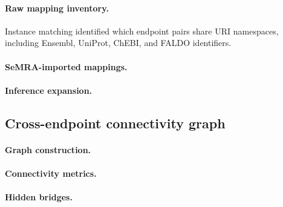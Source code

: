 \documentclass[12pt]{article}
\begin{document}
\paragraph*{Raw mapping inventory.}
Instance matching identified which endpoint pairs share URI
namespaces, including Ensembl, UniProt, ChEBI, and FALDO identifiers.

\paragraph*{SeMRA-imported mappings.}

\paragraph*{Inference expansion.}

\subsection{Cross-endpoint connectivity graph}
\label{sec:results-connectivity}

\paragraph*{Graph construction.}

\paragraph*{Connectivity metrics.}

\paragraph*{Hidden bridges.}
\end{document}
